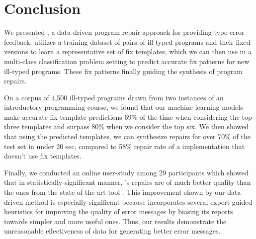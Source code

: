 \section{Conclusion}
\label{sec:conclusion}

We presented \toolname, a data-driven program repair approach for providing
type-error feedback. \toolname utilizes a training dataset of pairs of ill-typed
programs and their fixed versions to learn a representative set of fix
templates, which we can then use in a multi-class classification problem setting
to predict accurate fix patterns for new ill-typed programs. These fix patterns
finally guiding the synthesis of program repairs.

On a corpus of 4,500 ill-typed \ocaml programs drawn from two instances of an
introductory programming course, we found that our machine learning models make
accurate fix template predictions 69\% of the time when considering the top
three templates and surpass 80\% when we consider the top six. We then showed
that using the predicted templates, we can synthesize repairs for over 70\% of
the test set in under 20 sec, compared to 58\% repair rate of a \naive
implementation that doesn't use fix templates.

Finally, we conducted an online user-study among 29 participants which showed
that in statistically-significant manner, \toolname's repairs are of much better
quality than the ones from the state-of-the-art tool \seminal. This improvement
shown by our data-driven method is especially significant because \seminal
incorporates several expert-guided heuristics for improving the quality of error
messages by biasing its reports towards simpler and more useful ones. Thus, our
results demonstrate the unreasonable effectiveness of data for generating better
error messages.
